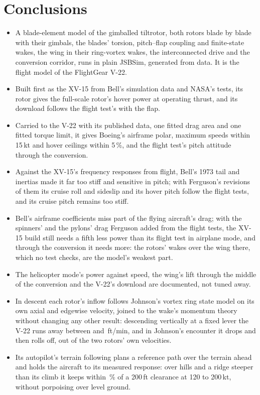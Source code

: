 \documentclass[10pt,a4paper,twocolumn]{article}
\begin{document}
\section{Conclusions}\label{sec:concl}
\begin{itemize}
\item A blade-element model of the gimballed tiltrotor, both rotors blade by blade with their gimbals, the blades' torsion, pitch--flap coupling and finite-state wakes, the
wing in their ring-vortex wakes, the interconnected drive and the conversion corridor, runs in plain JSBSim, generated from data. It is the flight
model of the FlightGear V-22.
\item Built first as the XV-15 from Bell's simulation data and NASA's tests, its rotor gives the full-scale rotor's hover power at operating thrust, and
its download follows the flight test's with the flap.
\item Carried to the V-22 with its published data, one fitted drag area and one fitted torque limit, it gives Boeing's airframe polar, maximum speeds
within 15\,kt and hover ceilings within 5\,\%, and the flight test's pitch attitude through the conversion.
\item Against the XV-15's frequency responses from flight, Bell's 1973 tail and inertias made it far too stiff and sensitive in pitch;
with Ferguson's revisions of them its cruise roll and sideslip and its hover pitch follow the flight tests, and its cruise pitch remains
too stiff.
\item Bell's airframe coefficients miss part of the flying aircraft's drag; with the spinners' and the pylons' drag Ferguson added from the flight
tests, the XV-15 build still needs a fifth less power than its flight test in airplane mode, and through the conversion it needs more: the rotors'
wakes over the wing there, which no test checks, are the model's weakest part.
\item The helicopter mode's power against speed, the wing's lift through the middle of the conversion and the V-22's download are documented, not tuned away.
\item In descent each rotor's inflow follows Johnson's vortex ring state model on its own axial and edgewise velocity, joined to the
wake's momentum theory without changing any other result: descending vertically at a fixed lever the V-22 runs away between \NVrsLo{}
and \NVrsHi\,ft/min, and in Johnson's encounter it drops and then rolls off, out of the two rotors' own velocities.
\item Its autopilot's terrain following plans a reference path over the terrain ahead and holds the aircraft to its measured response:
over hills and a ridge steeper than its climb it keeps within \NTfUnderPct\,\% of a 200\,ft clearance at 120 to 200\,kt, without porpoising over level ground.
\end{itemize}
\end{document}
